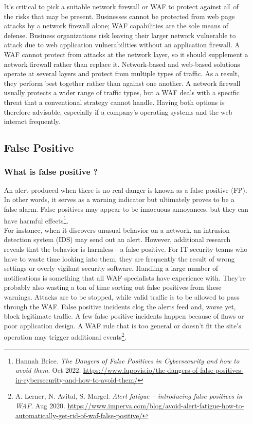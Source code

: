 It's critical to pick a suitable network firewall or WAF to protect against all of the risks that may be present. Businesses cannot be protected from web page attacks by a network firewall alone; WAF capabilities are the sole means of defense. Business organizations risk leaving their larger network vulnerable to attack due to web application vulnerabilities without an application firewall. A WAF cannot protect from attacks at the network layer, so it should supplement a network firewall rather than replace it. Network-based and web-based solutions operate at several layers and protect from multiple types of traffic. As a result, they perform best together rather than against one another. A network firewall usually protects a wider range of traffic types, but a WAF deals with a specific threat that a conventional strategy cannot handle. Having both options is therefore advisable, especially if a company's operating systems and the web interact frequently.
\subsection{False Positive}
\subsubsection{What is false positive ?}
An alert produced when there is no real danger is known as a false positive (FP). In other words, it serves as a warning indicator but ultimately proves to be a false alarm. False positives may appear to be innocuous annoyances, but they can have harmful effects\footnote{Hannah Brice. \textit{The Dangers of False Positives in Cybersecurity and how to avoid them}. Oct 2022. 
\url{https://www.lupovis.io/the-dangers-of-false-positives-in-cybersecurity-and-how-to-avoid-them/}}.\\
For instance, when it discovers unusual behavior on a network, an intrusion detection system (IDS) may send out an alert. However, additional research reveals that the behavior is harmless—a false positive. For IT security teams who have to waste time looking into them, they are frequently the result of wrong settings or overly vigilant security software.
\newpage
Handling a large number of notifications is something that all WAF specialists have experience with. They're probably also wasting a ton of time sorting out false positives from these warnings. Attacks are to be stopped, while valid traffic is to be allowed to pass through the WAF. False positive incidents clog the alerts feed and, worse yet, block legitimate traffic. A few false positive incidents happen because of flaws or poor application design. A WAF rule that is too general or doesn't fit the site's operation may trigger additional events\footnote{A. Lerner, N. Avital, S. Margel. 
\textit{Alert fatigue – introducing false positives in WAF}. Aug 2020.
\url{https://www.imperva.com/blog/avoid-alert-fatigue-how-to-automatically-get-rid-of-waf-false-positive/}}.
